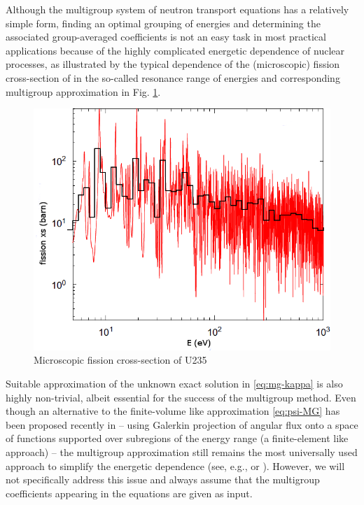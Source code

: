 Although the multigroup system of neutron transport equations has a relatively simple form, finding an optimal grouping
of energies and determining the associated group-averaged coefficients is not an easy task in most practical
applications because of the highly complicated energetic dependence of nuclear processes, as illustrated by the
typical dependence of the (microscopic) fission cross-section of  in the so-called resonance range
of energies and corresponding multigroup approximation in Fig. \ref{fig:xs}.
\begin{figure}[htp]
\begin{center}
  \includegraphics[scale=.4]{U235fg}
  \caption{Microscopic fission cross-section of U235}
  \label{fig:xs}
\end{center}
\end{figure}
Suitable approximation of the unknown exact solution in \eqref{eq:mg-kappa} is also highly non-trivial, albeit essential
for the success of the multigroup method. Even though an alternative to the finite-volume like approximation
\eqref{eq:psi-MG} has been proposed recently  in \cite{Douglass} -- using Galerkin projection of angular flux onto a
space of functions supported over subregions of the energy range (a finite-element like approach) --  the multigroup approximation still remains the most universally used approach to simplify the energetic dependence (see, e.g., \cite[Chap.~5]{Cacuci1} or \cite{Cho1}). However, we will
not specifically address this issue and always assume that the multigroup coefficients appearing in the equations 
are given as input.

